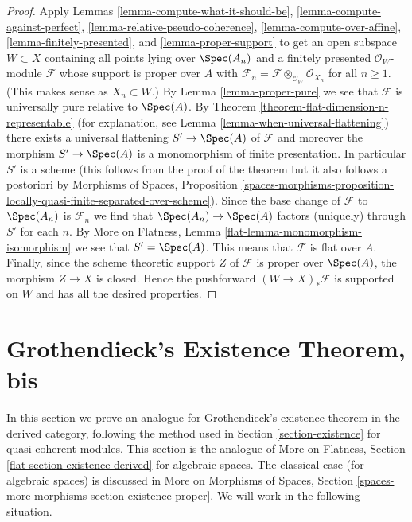 \begin{proof}
Apply Lemmas \ref{lemma-compute-what-it-should-be},
\ref{lemma-compute-against-perfect},
\ref{lemma-relative-pseudo-coherence},
\ref{lemma-compute-over-affine},
\ref{lemma-finitely-presented}, and
\ref{lemma-proper-support}
to get an open subspace $W \subset X$ containing all points
lying over $\Spec(A_n)$
and a finitely presented $\mathcal{O}_W$-module $\mathcal{F}$
whose support is proper over $A$ with
$\mathcal{F}_n = \mathcal{F} \otimes_{\mathcal{O}_W} \mathcal{O}_{X_n}$
for all $n \geq 1$. (This makes sense as $X_n \subset W$.)
By Lemma \ref{lemma-proper-pure} we see that $\mathcal{F}$
is universally pure relative to $\Spec(A)$.
By Theorem \ref{theorem-flat-dimension-n-representable}
(for explanation, see Lemma \ref{lemma-when-universal-flattening})
there exists a universal flattening $S' \to \Spec(A)$
of $\mathcal{F}$ and moreover the morphism $S' \to \Spec(A)$
is a monomorphism of finite presentation.
In particular $S'$ is a scheme (this follows from the proof
of the theorem but it also follows a postoriori by
Morphisms of Spaces, Proposition
\ref{spaces-morphisms-proposition-locally-quasi-finite-separated-over-scheme}).
Since the base change of $\mathcal{F}$ to $\Spec(A_n)$
is $\mathcal{F}_n$ we find that $\Spec(A_n) \to \Spec(A)$
factors (uniquely) through $S'$ for each $n$.
By More on Flatness, Lemma \ref{flat-lemma-monomorphism-isomorphism}
we see that $S' = \Spec(A)$.
This means that $\mathcal{F}$ is flat over $A$.
Finally, since the scheme theoretic support $Z$ of $\mathcal{F}$
is proper over $\Spec(A)$, the morphism $Z \to X$ is closed.
Hence the pushforward $(W \to X)_*\mathcal{F}$ is supported
on $W$ and has all the desired properties.
\end{proof}







\section{Grothendieck's Existence Theorem, bis}
\label{section-existence-derived}

\noindent
In this section we prove an analogue for Grothendieck's existence theorem
in the derived category, following the method used in
Section \ref{section-existence} for quasi-coherent modules.
This section is the analogue of
More on Flatness, Section \ref{flat-section-existence-derived}
for algebraic spaces. The classical case (for algebraic spaces)
is discussed in More on Morphisms of Spaces, Section
\ref{spaces-more-morphisms-section-existence-proper}.
We will work in the following situation.

